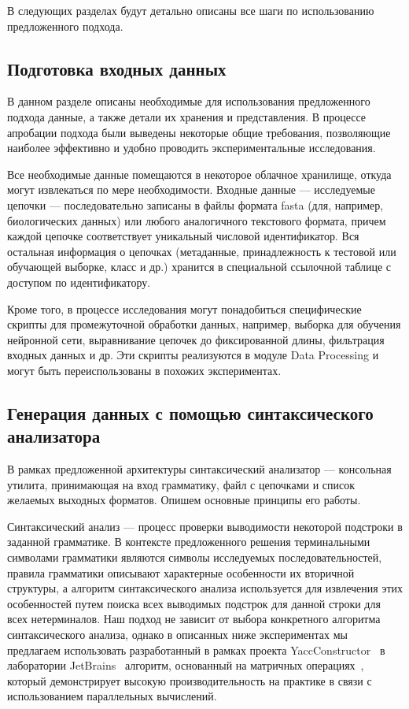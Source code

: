\documentclass[14pt]{matmex-diploma-custom}
\begin{document}
В следующих разделах будут детально описаны все шаги по использованию предложенного подхода.

\subsection{Подготовка входных данных}

В данном разделе описаны необходимые для использования 
предложенного подхода данные, а также детали их хранения и представления. В процессе апробации подхода были выведены некоторые общие требования, позволяющие наиболее эффективно и удобно проводить экспериментальные исследования. 

Все необходимые данные помещаются в некоторое облачное хранилище, откуда могут извлекаться по мере необходимости. Входные данные --- исследуемые цепочки --- последовательно записаны в файлы формата fasta (для, например, биологических данных) или любого аналогичного текстового формата, причем каждой цепочке соответствует уникальный числовой идентификатор. Вся остальная информация о цепочках (метаданные, принадлежность к тестовой или обучающей выборке, класс и др.) хранится в специальной ссылочной таблице с доступом по идентификатору. 

Кроме того, в процессе исследования могут понадобиться специфические скрипты для промежуточной обработки данных, например, выборка для обучения нейронной сети, выравнивание цепочек до фиксированной длины, фильтрация входных данных и др. Эти скрипты реализуются в модуле Data Processing и могут быть переиспользованы в похожих экспериментах.

\subsection{Генерация данных с помощью синтаксического анализатора}
В рамках предложенной архитектуры синтаксический анализатор --- консольная утилита, принимающая на вход грамматику, файл с цепочками и список желаемых выходных форматов. Опишем основные принципы его работы.

Синтаксический анализ --- процесс проверки выводимости некоторой подстроки в заданной грамматике. В контексте предложенного решения терминальными символами грамматики являются символы исследуемых последовательностей, правила грамматики описывают характерные особенности их вторичной структуры, а алгоритм синтаксического анализа используется для извлечения этих особенностей путем поиска всех выводимых подстрок для данной строки для всех нетерминалов. Наш подход не зависит от выбора конкретного алгоритма синтаксического анализа, однако в описанных ниже экспериментах мы предлагаем использовать разработанный в рамках проекта YaccConstructor~\cite{yacc} в лаборатории JetBrains~\cite{jetbrains} алгоритм, основанный на матричных операциях~\cite{Azimov:2018:CPQ:3210259.3210264}, который демонстрирует высокую производительность на практике в связи с использованием параллельных вычислений.
\end{document}
